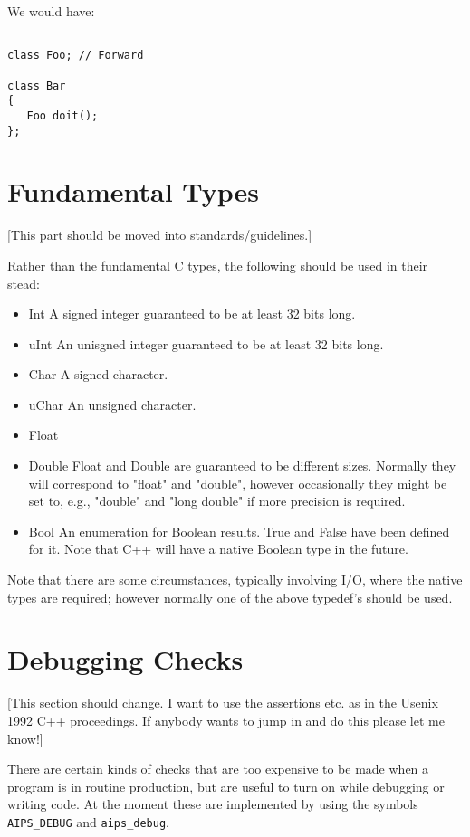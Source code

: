 We would have:
\begin{verbatim}

class Foo; // Forward

class Bar
{
   Foo doit();
};
\end{verbatim}

\section{Fundamental Types}

[This part should be moved into standards/guidelines.]

Rather than the fundamental C types, the following should be used in
their stead:

\begin{itemize}
\item Int
A signed integer guaranteed to be at least 32 bits long.
\item uInt
An unisgned integer guaranteed to be at least 32 bits long.
\item Char
A signed character.
\item uChar
An unsigned character.
\item Float
\item Double
Float and Double are guaranteed to be different sizes. Normally they
will correspond to "float" and "double", however occasionally they might
be set to, e.g., "double" and "long double" if more precision is required.
\item Bool
An enumeration for Boolean results. True and False have been defined for
it. Note that C++ will have a native Boolean type in the future.
\end{itemize}

Note that there are some circumstances, typically involving I/O, where
the native types are required; however normally one of the above
typedef's should be used.

\section{Debugging Checks}

[This section should change. I want to use the assertions etc. as in the
Usenix 1992 C++ proceedings. If anybody wants to jump in and do this
please let me know!]


There are certain kinds of checks that are too expensive to be made when
a program is in routine production, but are useful to turn on while
debugging or writing code. At the moment these are implemented by using
the symbols {\tt AIPS\_DEBUG} and {\tt aips\_debug}.

